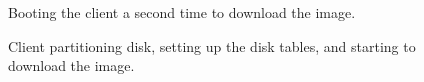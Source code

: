 
\begin{figure}[h!]
  \begin{center}
    \centerline{
      }
    \caption{Booting the client a second time to download the image.}
    \label{fig:sbs-install-boot}
  \end{center}
\end{figure}

\begin{figure}[h!]
  \begin{center}
    \centerline{
      }
    \caption{Client partitioning disk, setting up the disk tables, and
      starting to download the image.}
    \label{fig:sbs-install-diskpar}
  \end{center}
\end{figure}
  
